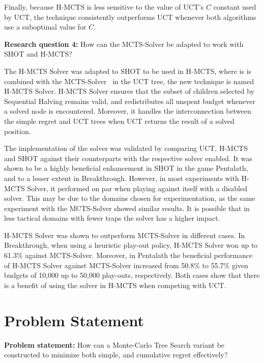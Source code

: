 \documentclass{kecsmstr}
\begin{document}
Finally, because H-MCTS is less sensitive to the value of UCT's $C$ constant used by UCT, the technique consistently outperforms UCT whenever both algorithms use a suboptimal value for $C$.

\vspace{2mm}
\textbf{Research question 4:} How can the MCTS-Solver be adapted to work with SHOT and H-MCTS?
\vspace{2mm}

The H-MCTS Solver was adapted to SHOT to be used in H-MCTS, where is is combined with the MCTS-Solver~ in the UCT tree, the new technique is named H-MCTS Solver. H-MCTS Solver ensures that the subset of children selected by Sequential Halving remains valid, and redistributes all unspent budget whenever a solved node is encountered. Moreover, it handles the interconnection between the simple regret and UCT trees when UCT returns the result of a solved position.

The implementation of the solver was validated by comparing UCT, H-MCTS and SHOT against their counterparts with the respective solver enabled. It was shown to be a highly beneficial enhancement in SHOT in the game Pentalath, and to a lesser extent in Breakthrough. However, in most experiments with H-MCTS Solver, it performed on par when playing against itself with a disabled solver. This may be due to the domains chosen for experimentation, as the same experiment with the MCTS-Solver showed similar results. It is possible that in less tactical domains with fewer traps the solver has a higher impact.

H-MCTS Solver was shown to outperform MCTS-Solver in different cases. In Breakthrough, when using a heuristic play-out policy, H-MCTS Solver won up to 61.3\% against MCTS-Solver. Moreover, in Pentalath the beneficial performance of H-MCTS Solver against MCTS-Solver increased from 50.8\% to 55.7\% given budgets of 10,000 up to 50,000 play-outs, respectively. Both cases show that there is a benefit of using the solver in H-MCTS when competing with UCT.
\newpage
\section{Problem Statement}

\vspace{2mm}
\textbf{Problem statement:} How can a Monte-Carlo Tree Search variant be constructed to minimize both simple, and cumulative regret effectively?
\vspace{2mm}
\end{document}
